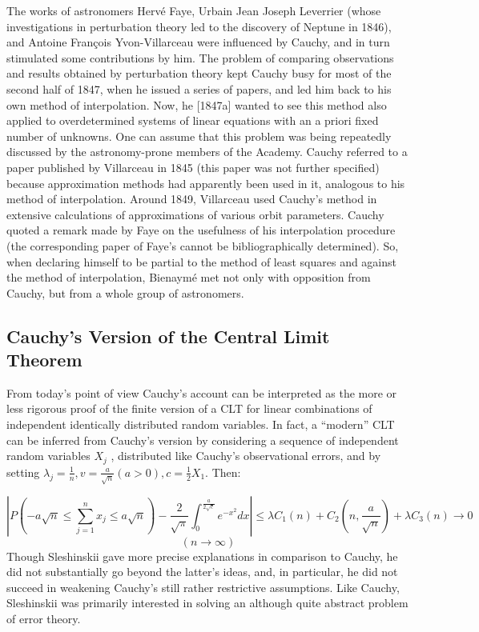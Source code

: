 \documentclass{article}
\begin{document}
The works of astronomers Hervé Faye, Urbain Jean Joseph Leverrier (whose investigations in perturbation theory led to the discovery of Neptune in 1846), and Antoine François Yvon-Villarceau were influenced by Cauchy, and in turn stimulated some contributions by him. The problem of comparing observations and results obtained by perturbation theory kept Cauchy busy for most of the second half of 1847, when he issued a series of papers, and led him back to his own method of interpolation. Now, he [1847a] wanted to see this method also applied to overdetermined systems of linear equations with an a priori fixed number of unknowns. 
One can assume that this problem was being
repeatedly discussed by the astronomy-prone members of the Academy.
Cauchy  referred to a paper published by Villarceau in 1845 (this paper was not further specified) because approximation methods had apparently been used in it, analogous to his method of interpolation. Around 1849, Villarceau used Cauchy’s method in extensive calculations of approximations of various orbit parameters. Cauchy \cite{1852Comptes} quoted a remark made by Faye on the usefulness of his interpolation procedure (the corresponding paper of Faye’s cannot be bibliographically determined).
So, when declaring himself to be partial to the method of least squares and against the method of interpolation, Bienaymé met not only with opposition from Cauchy, but from a whole group of astronomers.

\subsection{Cauchy’s Version of the Central Limit Theorem}

From today’s point of view Cauchy’s account can be interpreted as the more or
less rigorous proof of the finite version of a CLT for linear combinations of independent identically distributed random variables. In fact, a “modern” CLT can be inferred from Cauchy’s version by considering a sequence of independent random
variables $X_j$ , distributed like Cauchy’s observational errors, and by setting $\lambda_j = \frac{1}{n}, v=\frac{a}{\sqrt{n}}(a>0), c=\frac{1}{2}X_1 $. Then:

\[ | P(- a \sqrt{n} \leq \sum_{j=1}^n x_j \leq a\sqrt{n}  ) - \frac{2}{\sqrt{\pi}} \int_0^{\frac{a}{2\sqrt{c}}} e^{-x^2} dx  |   \leq \lambda C_1(n) +C_2(n,\frac{a}{\sqrt{n}})+\lambda C_3(n) \rightarrow 0 \] \[(n \rightarrow \infty) \]
Though Sleshinskii gave more precise explanations in comparison to Cauchy, he did not substantially go beyond the latter’s ideas, and, in particular, he did not succeed in weakening Cauchy’s still rather restrictive assumptions. 
Like Cauchy, Sleshinskii was primarily interested in solving an although quite abstract problem of error theory.
\end{document}
